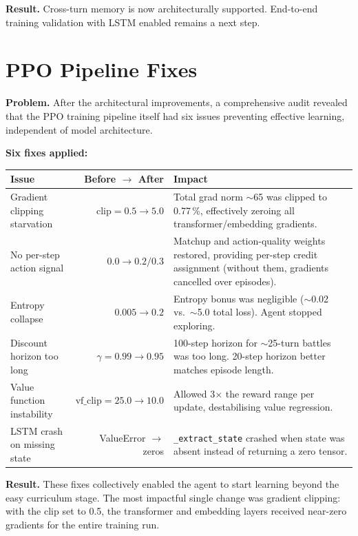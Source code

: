 \textbf{Result.} Cross-turn memory is now architecturally supported.
End-to-end training validation with LSTM enabled remains a next step.

\section{PPO Pipeline Fixes}

\textbf{Problem.} After the architectural improvements, a comprehensive audit
revealed that the PPO training pipeline itself had six issues preventing
effective learning, independent of model architecture.

\textbf{Six fixes applied:}

\begin{center}
\small
\begin{tabularx}{\textwidth}{l r X}
  \toprule
  \textbf{Issue} & \textbf{Before $\to$ After} & \textbf{Impact} \\
  \midrule
  Gradient clipping starvation &
    $\text{clip}=0.5 \to 5.0$ &
    Total grad norm $\sim$65 was clipped to 0.77\,\%, effectively zeroing
    all transformer/embedding gradients. \\
  No per-step action signal &
    $0.0 \to 0.2/0.3$ &
    Matchup and action-quality weights restored, providing per-step credit
    assignment (without them, gradients cancelled over episodes). \\
  Entropy collapse &
    $0.005 \to 0.2$ &
    Entropy bonus was negligible ($\sim$0.02 vs.\ $\sim$5.0 total loss).
    Agent stopped exploring. \\
  Discount horizon too long &
    $\gamma=0.99 \to 0.95$ &
    100-step horizon for $\sim$25-turn battles was too long.  20-step
    horizon better matches episode length. \\
  Value function instability &
    $\text{vf\_clip}=25.0 \to 10.0$ &
    Allowed 3$\times$ the reward range per update, destabilising value
    regression. \\
  LSTM crash on missing state &
    ValueError $\to$ zeros &
    \texttt{\_extract\_state} crashed when state was absent instead of
    returning a zero tensor. \\
  \bottomrule
\end{tabularx}
\end{center}

\textbf{Result.} These fixes collectively enabled the agent to start learning
beyond the easy curriculum stage.  The most impactful single change was
gradient clipping: with the clip set to 0.5, the transformer and embedding
layers received near-zero gradients for the entire training run.

